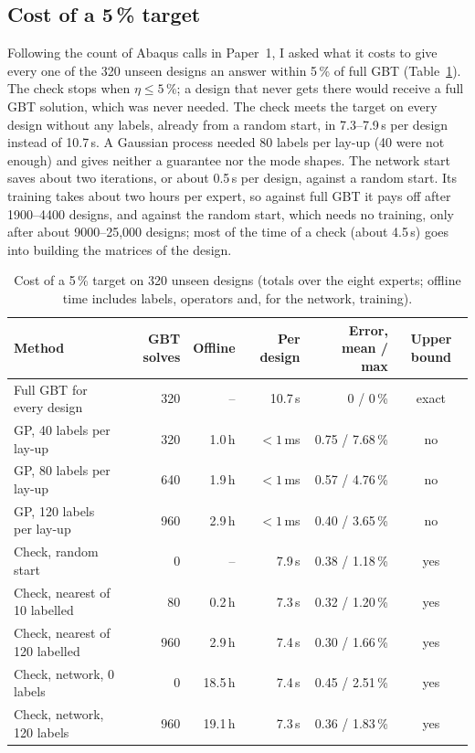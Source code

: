 \documentclass[11pt,a4paper]{article}
\newcommand{\pc}{\,\%}
\begin{document}
\subsection{Cost of a 5\,\% target}
Following the count of Abaqus calls in Paper~1, I asked what it costs to give every one of the 320 unseen designs an answer within 5\pc{} of full GBT (Table~\ref{tab:cost}). The check stops when $\eta\le5\pc$; a design that never gets there would receive a full GBT solution, which was never needed. The check meets the target on every design without any labels, already from a random start, in 7.3--7.9\,s per design instead of 10.7\,s. A Gaussian process needed 80 labels per lay-up (40 were not enough) and gives neither a guarantee nor the mode shapes. The network start saves about two iterations, or about 0.5\,s per design, against a random start. Its training takes about two hours per expert, so against full GBT it pays off after 1900--4400 designs, and against the random start, which needs no training, only after about 9000--25{,}000 designs; most of the time of a check (about 4.5\,s) goes into building the matrices of the design.

\begin{table}[h]
\centering\small
\caption{Cost of a 5\pc{} target on 320 unseen designs (totals over the eight experts; offline time includes labels, operators and, for the network, training).}
\label{tab:cost}
\begin{tabular}{@{}lrrrrc@{}}
\toprule
Method & GBT solves & Offline & Per design & Error, mean / max & Upper bound \\
\midrule
Full GBT for every design & 320 & -- & 10.7\,s & 0 / 0\pc & exact \\
GP, 40 labels per lay-up & 320 & 1.0\,h & $<1$\,ms & 0.75 / 7.68\pc & no \\
GP, 80 labels per lay-up & 640 & 1.9\,h & $<1$\,ms & 0.57 / 4.76\pc & no \\
GP, 120 labels per lay-up & 960 & 2.9\,h & $<1$\,ms & 0.40 / 3.65\pc & no \\
Check, random start & 0 & -- & 7.9\,s & 0.38 / 1.18\pc & yes \\
Check, nearest of 10 labelled & 80 & 0.2\,h & 7.3\,s & 0.32 / 1.20\pc & yes \\
Check, nearest of 120 labelled & 960 & 2.9\,h & 7.4\,s & 0.30 / 1.66\pc & yes \\
Check, network, 0 labels & 0 & 18.5\,h & 7.4\,s & 0.45 / 2.51\pc & yes \\
Check, network, 120 labels & 960 & 19.1\,h & 7.3\,s & 0.36 / 1.83\pc & yes \\
\bottomrule
\end{tabular}
\end{table}
\end{document}
